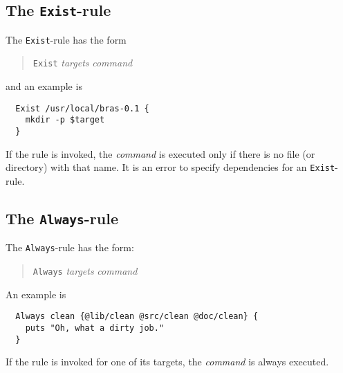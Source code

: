 \documentclass[12pt]{article}
\begin{document}
\subsection{The \texttt{Exist}-rule}

The \texttt{Exist}-rule has the form
\begin{quote}
  \texttt{Exist} \textit{targets} \textit{command}
\end{quote}
and an example is
\begin{verbatim}
  Exist /usr/local/bras-0.1 {
    mkdir -p $target
  }
\end{verbatim}
If the rule is invoked, the \textit{command} is executed only if
there is no file (or directory) with that name.  It is an error to
specify dependencies for an \texttt{Exist}-rule.

\subsection{The \texttt{Always}-rule}

The \texttt{Always}-rule has the form:

\begin{quote}
  \texttt{Always} \textit{targets} \textit{command}
\end{quote}

An example is
\begin{verbatim}
  Always clean {@lib/clean @src/clean @doc/clean} {
    puts "Oh, what a dirty job."
  }
\end{verbatim}

If the rule is invoked for one of its targets, the \textit{command} is
always executed.


\end{document}
